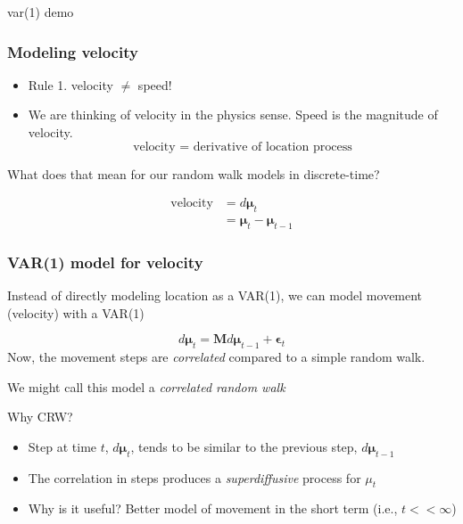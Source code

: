 \documentclass[36pt,handout]{beamer}
\newcommand{\ft}[1]{\frametitle{#1}}
\newcommand{\bmu}{\boldsymbol{\mu}}
\newcommand{\be}{\boldsymbol{\epsilon}}
\begin{document}

\begin{frame}
var(1) demo
\end{frame}


\begin{frame}
\ft{Modeling velocity}

\begin{itemize}
\item Rule 1. velocity $\ne$ speed!
\item We are thinking of velocity in the physics sense. Speed is the magnitude of velocity. 
$$\mbox{velocity = derivative of location process}$$
\end{itemize}
\bigskip

What does that mean for our random walk models in discrete-time? 

$$
\begin{aligned}
\mbox{velocity} &= d\bmu_t \\ 
&= \bmu_t-\bmu_{t-1} 
\end{aligned}
$$
\end{frame}


\begin{frame}
\ft{VAR(1) model for velocity}

Instead of directly modeling location as a VAR(1), we can model movement (velocity) with a VAR(1)

$$d\bmu_t = \mathbf{M}d\bmu_{t-1} + \be_t$$
Now, the movement steps are {\em correlated} compared to a simple random walk. 
\medskip

We might call this model  a {\em correlated random walk}
\medskip

\textcolor{noaaturq}{\Large Why CRW?}
\begin{itemize}
\item Step at time $t$, $d\bmu_t$, tends to be similar to the previous step, $d\bmu_{t-1}$
\item The correlation in steps produces a {\em superdiffusive} process for $\mu_t$
\item Why is it useful? Better model of movement in the short term (i.e., $t<<\infty$)
\end{itemize}
\end{frame}

\end{document}
